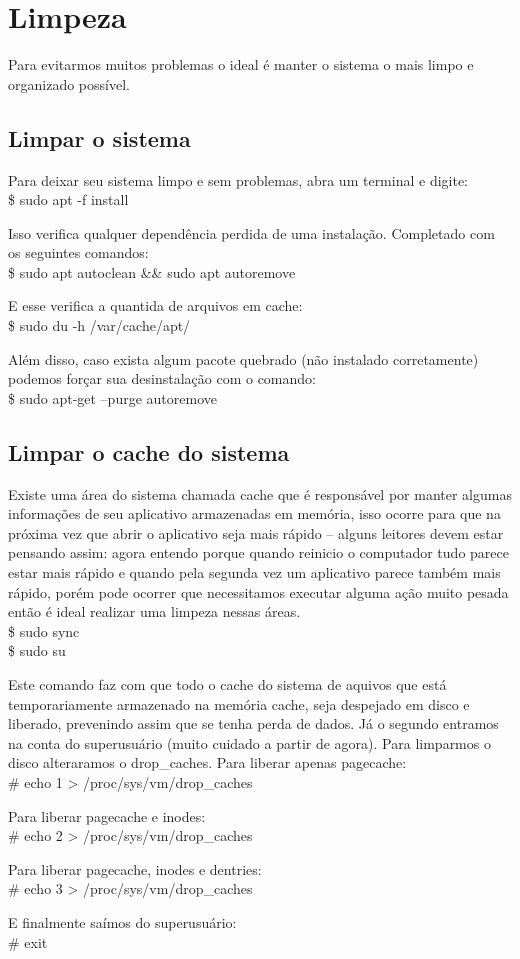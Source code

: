 \section{Limpeza}
Para evitarmos muitos problemas o ideal é manter o sistema o mais limpo e organizado possível.

\subsection{Limpar o sistema}
Para deixar seu sistema limpo e sem problemas, abra um terminal e digite: \\
{\ttfamily\$ sudo apt -f install}

Isso verifica qualquer dependência perdida de uma instalação. Completado com os seguintes comandos: \\
{\ttfamily\$ sudo apt autoclean \&\& sudo apt autoremove}

E esse verifica a quantida de arquivos em cache: \\
{\ttfamily\$ sudo du -h /var/cache/apt/}

Além disso, caso exista algum pacote quebrado (não instalado corretamente) podemos forçar sua desinstalação com o comando: \\
{\ttfamily\$ sudo apt-get --purge autoremove}

\subsection{Limpar o cache do sistema}
Existe uma área do sistema chamada cache que é responsável por manter algumas informações de seu aplicativo armazenadas em memória, isso ocorre para que na próxima vez que abrir o aplicativo seja mais rápido – alguns leitores devem estar pensando assim: agora entendo porque quando reinicio o computador tudo parece estar mais rápido e quando pela segunda vez um aplicativo parece também mais rápido, porém pode ocorrer que necessitamos executar alguma ação muito pesada então é ideal realizar uma limpeza nessas áreas. \\
{\ttfamily\$ sudo sync \\
\$ sudo su}

Este comando faz com que todo o cache do sistema de aquivos que está temporariamente armazenado na memória cache, seja despejado em disco e liberado, prevenindo assim que se tenha perda de dados. Já o segundo entramos na conta do superusuário (muito cuidado a partir de agora). Para limparmos o disco alteraramos o drop\_caches. Para liberar apenas pagecache: \\
{\ttfamily\# echo 1 > /proc/sys/vm/drop\_caches}

Para liberar pagecache e inodes: \\
{\ttfamily\# echo 2 > /proc/sys/vm/drop\_caches}

Para liberar pagecache, inodes e dentries: \\
{\ttfamily\# echo 3 > /proc/sys/vm/drop\_caches}

E finalmente saímos do superusuário: \\
{\ttfamily\# exit}

\clearpage